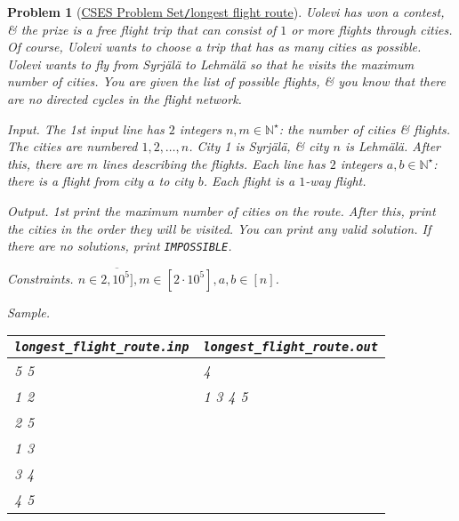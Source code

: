 \documentclass{article}
\newtheorem{problem}{Problem}
\begin{document}
\begin{problem}[\href{https://cses.fi/problemset/task/1680}{CSES Problem Set{\tt/}longest flight route}]
    Uolevi has won a contest, \& the prize is a free flight trip that can consist of $1$ or more flights through cities. Of course, Uolevi wants to choose a trip that has as many cities as possible. Uolevi wants to fly from Syrjälä to Lehmälä so that he visits the maximum number of cities. You are given the list of possible flights, \& you know that there are no directed cycles in the flight network. 
    \item {\sf Input.} The 1st input line has $2$ integers $n,m\in\mathbb{N}^\star$: the number of cities \& flights. The cities are numbered $1,2,\ldots,n$. City 1 is Syrjälä, \& city $n$ is Lehmälä. After this, there are $m$ lines describing the flights. Each line has $2$ integers $a,b\in\mathbb{N}^\star$: there is a flight from city $a$ to city $b$. Each flight is a $1$-way flight.
    \item {\sf Output.} 1st print the maximum number of cities on the route. After this, print the cities in the order they will be visited. You can print any valid solution. If there are no solutions, print {\tt IMPOSSIBLE}.
    \item {\sf Constraints.} $n\in\overline{2,10^5]},m\in[2\cdot10^5],a,b\in[n]$.
    \item {\sf Sample.}
    \begin{table}[H]
        \centering
        \begin{tabular}{|l|l|}
            \hline
            \verb|longest_flight_route.inp| & \verb|longest_flight_route.out| \\
            \hline
            5 5 & 4 \\
            1 2 & 1 3 4 5 \\
            2 5 & \\
            1 3 & \\
            3 4 & \\
            4 5 & \\
            \hline
        \end{tabular}
    \end{table}
\end{problem}
\end{document}
